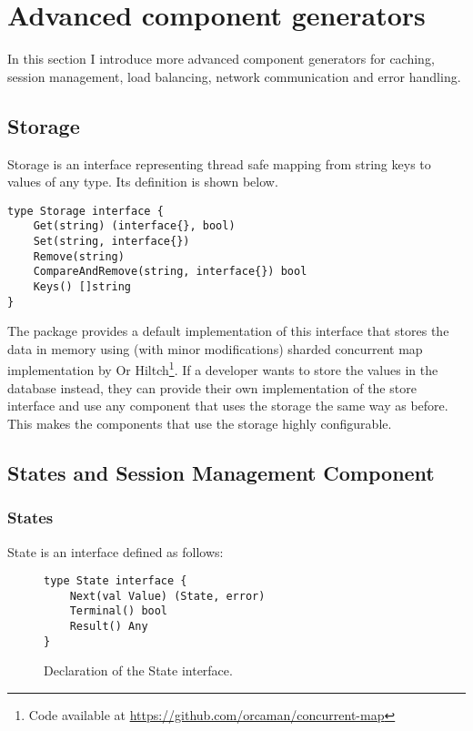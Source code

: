 \documentclass[12pt,a4paper]{article}
\begin{document}

\newpage
\section{Advanced component generators}
\label{sec:impl2}
In this section I introduce more advanced component generators for caching,
session management, load balancing, network communication and error handling.

\subsection{Storage}
Storage is an interface representing thread safe mapping from string keys
to values of any type. Its definition is shown below.
\begin{lstlisting}
type Storage interface {
    Get(string) (interface{}, bool)
    Set(string, interface{})
    Remove(string)
    CompareAndRemove(string, interface{}) bool
    Keys() []string
}
\end{lstlisting}
The package provides a default implementation of this interface that
stores the data in memory using (with minor modifications) sharded concurrent map implementation
by Or Hiltch\footnote{Code available at \url{https://github.com/orcaman/concurrent-map}}.
If a developer wants to store the values in the 
database instead, they can provide their own implementation of the store interface
and use any component that uses the storage the same way as before.
This makes the components that use the storage highly configurable.


\subsection{States and Session Management Component}
\subsubsection{States}
State is an interface defined as follows:
\begin{figure}[h]
\centering
\begin{lstlisting}
type State interface {
    Next(val Value) (State, error)
    Terminal() bool
    Result() Any
}
\end{lstlisting}
\caption[scale=1.0]{Declaration of the State interface.}
\label{fig:State}
\end{figure}
\end{document}
